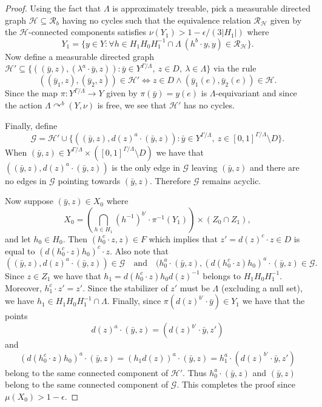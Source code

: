 \documentclass[12pt]{amsart}
\theoremstyle{definition}
\def\cal{\mathcal}
\newcommand{\acts}{\curvearrowright}
\begin{document}
\begin{proof}
    Using the fact that $\Lambda$ is approximately treeable, pick a measurable directed graph $\cal H \subseteq \cal R_b$ having no cycles such that the equivalence relation $\cal R_\cal H$ given by the $\cal H$-connected components satisfies $\nu(Y_1) > 1 - \epsilon / (3|H_1|)$ where
    \[Y_1 = \{y \in Y : \forall h \in H_1 H_0 H_1^{-1} \cap \Lambda \ (h^b \cdot y, y) \in \cal R_\cal H\}.\]
    Now define a measurable directed graph $\cal H' \subseteq \{((\bar y, z), (\lambda^a \cdot \bar y, z)) : \bar y \in Y^{\Gamma / \Lambda}, \ z \in D, \ \lambda \in \Lambda\}$ via the rule
    \[((\bar y_1, z), (\bar y_2,z)) \in \cal H' \Leftrightarrow z \in D \wedge (\bar y_1(e), \bar y_2(e)) \in \cal H.\]
    Since the map $\pi : Y^{\Gamma / \Lambda} \rightarrow Y$ given by $\pi(\bar y) = y(e)$ is $\Lambda$-equivariant and since the action $\Lambda \acts^b (Y, \nu)$ is free, we see that $\cal H'$ has no cycles.
    
    Finally, define
    \[\cal G = \cal H' \cup \{((\bar y, z), d(z)^a \cdot (\bar y, z)) : \bar y \in Y^{\Gamma / \Lambda}, \ z \in [0,1]^{\Gamma / \Lambda} \setminus D\}.\]
    When $(\bar y, z) \in Y^{\Gamma / \Lambda} \times ([0,1]^{\Gamma / \Lambda} \setminus D)$ we have that $((\bar y, z), d(z)^a \cdot (\bar y, z))$ is the only edge in $\cal G$ leaving $(\bar y, z)$ and there are no edges in $\cal G$ pointing towards $(\bar y, z)$. Therefore $\cal G$ remains acyclic.

    Now suppose $(\bar y, z) \in X_0$ where
    \[X_0 = \left( \bigcap_{h \in H_1} (h^{-1})^{b'} \cdot \pi^{-1}(Y_1) \right) \times (Z_0 \cap Z_1),\]
    and let $h_0 \in H_0$. Then $(h_0^c \cdot z, z) \in F$ which implies that $z' = d(z)^c \cdot z \in D$ is equal to $(d(h_0^c \cdot z) h_0)^c \cdot z$. Also note that
    \[((\bar y, z), d(z)^a \cdot (\bar y, z)) \in \cal G \quad \text{and} \quad (h_0^a \cdot (\bar y, z), (d(h_0^c \cdot z) h_0)^a \cdot (\bar y, z) \in \cal G.\]
    Since $z \in Z_1$ we have that $h_1 = d(h_0^c \cdot z) h_0 d(z)^{-1}$ belongs to $H_1 H_0 H_1^{-1}$. Moreover, $h_1^c \cdot z' = z'$. Since the stabilizer of $z'$ must be $\Lambda$ (excluding a null set), we have $h_1 \in H_1 H_0 H_1^{-1} \cap \Lambda$. Finally, since $\pi(d(z)^{b'} \cdot \bar y) \in Y_1$ we have that the points
    \[d(z)^a \cdot (\bar y, z) = (d(z)^{b'} \cdot \bar y, z')\]
    and
    \[(d(h_0^c \cdot z) h_0)^a \cdot (\bar y, z) = (h_1 d(z))^a \cdot (\bar y, z) = h_1^a \cdot (d(z)^{b'} \cdot \bar y, z')\]
    belong to the same connected component of $\cal H'$. Thus $h_0^a \cdot (\bar y, z)$ and $(\bar y, z)$ belong to the same connected component of $\cal G$. This completes the proof since $\mu(X_0) > 1 - \epsilon$.
\end{proof}
\end{document}
